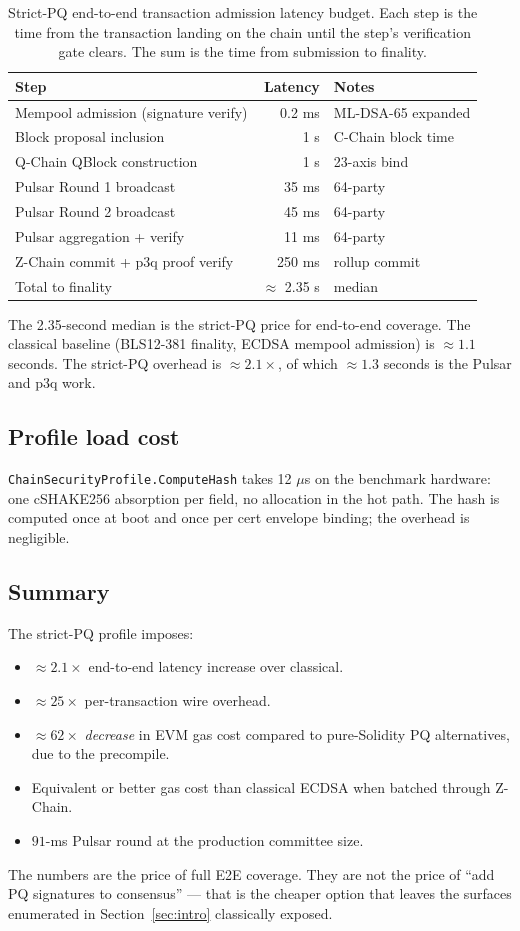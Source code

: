 \begin{table}[H]
\centering
\caption{Strict-PQ end-to-end transaction admission latency budget. Each
step is the time from the transaction landing on the chain until the
step's verification gate clears. The sum is the time from submission to
finality.}
\label{tab:e2e-latency}
\begin{tabular}{lrl}
\toprule
Step & Latency & Notes \\
\midrule
Mempool admission (signature verify) & 0.2 ms & ML-DSA-65 expanded \\
Block proposal inclusion              & 1 s   & C-Chain block time \\
Q-Chain QBlock construction            & 1 s   & 23-axis bind \\
Pulsar Round 1 broadcast             & 35 ms & 64-party \\
Pulsar Round 2 broadcast             & 45 ms & 64-party \\
Pulsar aggregation + verify          & 11 ms & 64-party \\
Z-Chain commit + p3q proof verify      & 250 ms & rollup commit \\
Total to finality                      & $\approx$ 2.35 s & median \\
\bottomrule
\end{tabular}
\end{table}

The 2.35-second median is the strict-PQ price for end-to-end coverage. The
classical baseline (BLS12-381 finality, ECDSA mempool admission) is
$\approx 1.1$ seconds. The strict-PQ overhead is $\approx 2.1\times$, of
which $\approx 1.3$ seconds is the Pulsar and p3q work.

\subsection{Profile load cost}

\texttt{ChainSecurityProfile.ComputeHash} takes 12 $\mu$s on the
benchmark hardware: one cSHAKE256 absorption per field, no allocation in
the hot path. The hash is computed once at boot and once per cert envelope
binding; the overhead is negligible.

\subsection{Summary}

The strict-PQ profile imposes:

\begin{itemize}[leftmargin=2em,nosep]
  \item $\approx 2.1\times$ end-to-end latency increase over classical.
  \item $\approx 25\times$ per-transaction wire overhead.
  \item $\approx 62\times$ \emph{decrease} in EVM gas cost compared to
    pure-Solidity PQ alternatives, due to the precompile.
  \item Equivalent or better gas cost than classical ECDSA when batched
    through Z-Chain.
  \item $91$-ms Pulsar round at the production committee size.
\end{itemize}

The numbers are the price of full E2E coverage. They are not the price of
``add PQ signatures to consensus'' --- that is the cheaper option that
leaves the surfaces enumerated in Section~\ref{sec:intro} classically
exposed.
